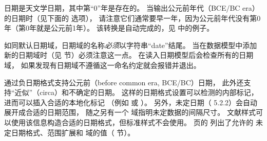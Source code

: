 
 日期是天文学日期，其中第“0”年是存在的。
当输出公元前年代（BCE/BC era）的日期时（见下面的  选项），
请注意它们通常要早一年，因为公元前年代没有第0年（第0年就是公元前1年）。
该转换是自动完成的，见 中的例子。


如同默认日期域，日期域的名称\emph{必须}以字符串“date”结尾。
当在数据模型中添加新的日期域时（见  节）必须注意这一点。
\biblatex 在读入日期模型后会检查所有的日期域，
如果发现有日期域不遵循这一命名约定就会报错并退出。


 通过负日期格式支持公元前（before common era, BCE/BC）日期，
此外还支持“近似”（circa）和不确定的日期。
这样的日期格式设置可以检测的内部标记，进而可以插入合适的本地化标记
（例如   或 ）。
另外，未定日期（ 5.2.2）会自动展开成合适的日期范围，
随之另有一个 域指明未定数据的间隔尺寸。
文献样式可以使用该信息构造合适的日期格式，但标准样式不会使用。
\pageref{bib:use:tab3} 页的 列出了允许的  未定日期格式、范围扩展和  域的值（ 节）。

